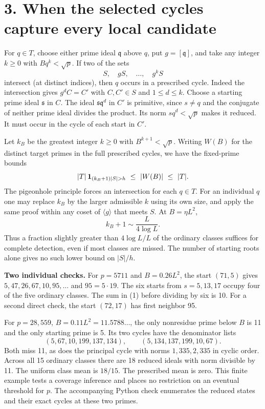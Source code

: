 \documentclass[11pt]{article}
\begin{document}
\newpage
\section*{3. When the selected cycles capture every local candidate}
For \(q\in T\), choose either prime ideal \(\mathfrak q\) above \(q\),
put \(g=[\mathfrak q]\), and take any integer \(k\ge0\) with
\(Bq^k<\sqrt p\). If two of the sets
\[
 S,\quad gS,\quad\ldots,\quad g^k S
\]
intersect (at distinct indices), then \(q\) occurs in a prescribed cycle.
Indeed the intersection gives \(g^d C=C'\) with \(C,C'\in S\) and
\(1\le d\le k\). Choose a starting prime ideal \(\mathfrak s\) in \(C\).
The ideal \(\mathfrak s\mathfrak q^d\) in \(C'\) is primitive, since
\(s\ne q\) and the conjugate of neither prime ideal divides the product.
Its norm \(s q^d<\sqrt p\) makes it reduced. It must occur in the cycle
of each start in \(C'\).

Let \(k_B\) be the greatest integer \(k\ge0\) with \(B^{k+1}<\sqrt p\).
Writing \(W(B)\) for the distinct target primes in the full prescribed
cycles, we have the fixed-prime bounds
\begin{equation}
 |T|\,{\bf1}_{(k_B+1)|S|>h}\ \le\ |W(B)|\ \le\ |T|.
\end{equation}
The pigeonhole principle forces an intersection for each \(q\in T\).
For an individual \(q\) one may replace \(k_B\) by the larger admissible
\(k\) using its own size, and apply the same proof within any coset of
\(\langle g\rangle\) that meets \(S\). At \(B=\eta L^2\),
\[
 k_B+1\sim \frac{L}{4\log L}.
\]
Thus a fraction slightly greater than \(4\log L/L\) of the ordinary
classes suffices for complete detection, even if most classes are missed.
The number of starting roots alone gives no such lower bound on \(|S|/h\).

\textbf{Two individual checks.} For \(p=5711\) and \(B=0.26 L^2\),
the start \((71,5)\) gives \(5,47,26,67,10,95,\ldots\) and
\(95=5\cdot19\). The six starts from \(s=5,13,17\) occupy four of the
five ordinary classes. The sum in (1) before dividing by six is 10.
For a second direct check, the start \((72,17)\) has first neighbor 95.

For \(p=28{,}559\), \(B=0.11L^2=11.5788\ldots\), the only nonresidue
prime below \(B\) is 11 and the only starting prime is 5. Its two cycles
have the denominator lists
\[
 (5,67,10,199,137,134),\qquad(5,134,137,199,10,67).
\]
Both miss 11, as does the principal cycle with norms \(1,335,2,335\)
in cyclic order. Across all 15 ordinary classes there are 18 reduced
ideals with norm divisible by 11. The uniform class mean is \(18/15\).
The prescribed mean is zero. This finite example tests a coverage
inference and places no restriction on an eventual threshold for \(p\).
The accompanying Python check enumerates the reduced states and their exact
cycles at these two primes.
\end{document}
